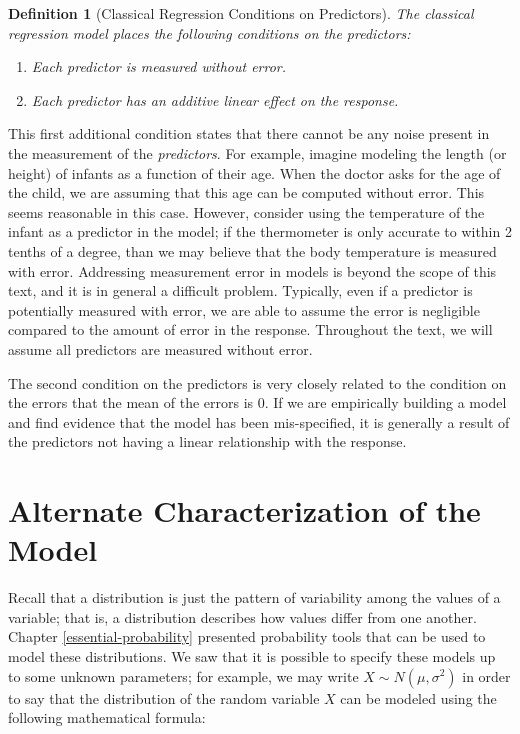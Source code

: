 \documentclass[
]{book}
\providecommand{\tightlist}{%
  \setlength{\itemsep}{0pt}\setlength{\parskip}{0pt}}
\theoremstyle{plain}
\theoremstyle{mydefn}
\newtheorem{definition}{Definition}[chapter]
\theoremstyle{myexmpl}
\theoremstyle{remark}
\begin{document}
\begin{definition}[Classical Regression Conditions on Predictors]

The classical regression model places the following conditions on the predictors:

\begin{enumerate}
\def\labelenumi{\arabic{enumi}.}
\tightlist
\item
  Each predictor is measured without error.
\item
  Each predictor has an additive linear effect on the response.
\end{enumerate}

\end{definition}

This first additional condition states that there cannot be any noise present in the measurement of the \emph{predictors}. For example, imagine modeling the length (or height) of infants as a function of their age. When the doctor asks for the age of the child, we are assuming that this age can be computed without error. This seems reasonable in this case. However, consider using the temperature of the infant as a predictor in the model; if the thermometer is only accurate to within 2 tenths of a degree, than we may believe that the body temperature is measured with error. Addressing measurement error in models is beyond the scope of this text, and it is in general a difficult problem. Typically, even if a predictor is potentially measured with error, we are able to assume the error is negligible compared to the amount of error in the response. Throughout the text, we will assume all predictors are measured without error.

The second condition on the predictors is very closely related to the condition on the errors that the mean of the errors is 0. If we are empirically building a model and find evidence that the model has been mis-specified, it is generally a result of the predictors not having a linear relationship with the response.

\hypertarget{alternate-characterization-of-the-model}{%
\section{Alternate Characterization of the Model}\label{alternate-characterization-of-the-model}}

Recall that a distribution is just the pattern of variability among the values of a variable; that is, a distribution describes how values differ from one another. Chapter \ref{essential-probability} presented probability tools that can be used to model these distributions. We saw that it is possible to specify these models up to some unknown parameters; for example, we may write \(X \sim N\left(\mu, \sigma^2\right)\) in order to say that the distribution of the random variable \(X\) can be modeled using the following mathematical formula:
\end{document}
